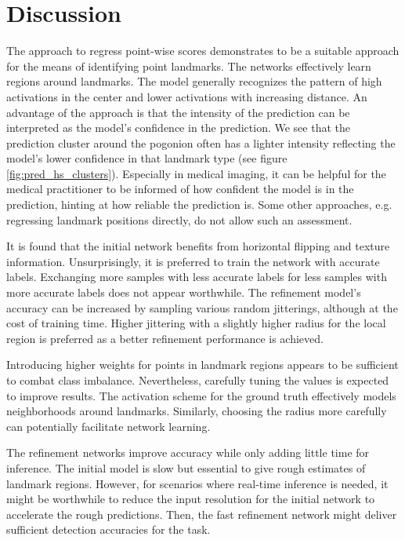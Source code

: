 \documentclass[class=article, crop=false]{standalone}
\begin{document}
\section{Discussion}
The approach to regress point-wise scores demonstrates to be a suitable approach for the means of identifying point landmarks. The networks effectively learn regions around landmarks. The model generally recognizes the pattern of high activations in the center and lower activations with increasing distance. An advantage of the approach is that the intensity of the prediction can be interpreted as the model's confidence in the prediction. We see that the prediction cluster around the pogonion often has a lighter intensity reflecting the model's lower confidence in that landmark type (see figure \ref{fig:pred_hs_clusters}). Especially in medical imaging, it can be helpful for the medical practitioner to be informed of how confident the model is in the prediction, hinting at how reliable the prediction is. Some other approaches, e.g. regressing landmark positions directly, do not allow such an assessment.

It is found that the initial network benefits from horizontal flipping and texture information. Unsurprisingly, it is preferred to train the network with accurate labels. Exchanging more samples with less accurate labels for less samples with more accurate labels does not appear worthwhile. 
The refinement model's accuracy can be increased by sampling various random jitterings, although at the cost of training time. Higher jittering with a slightly higher radius for the local region is preferred as a better refinement performance is achieved.

Introducing higher weights for points in landmark regions appears to be sufficient to combat class imbalance. Nevertheless, carefully tuning the values is expected to improve results. The activation scheme for the ground truth effectively models neighborhoods around landmarks. Similarly, choosing the radius more carefully can potentially facilitate network learning.


The refinement networks improve accuracy while only adding little time for inference. The initial model is slow but essential to give rough estimates of landmark regions. However, for scenarios where real-time inference is needed, it might be worthwhile to reduce the input resolution for the initial network to accelerate the rough predictions. Then, the fast refinement network might deliver sufficient detection accuracies for the task.
\end{document}
